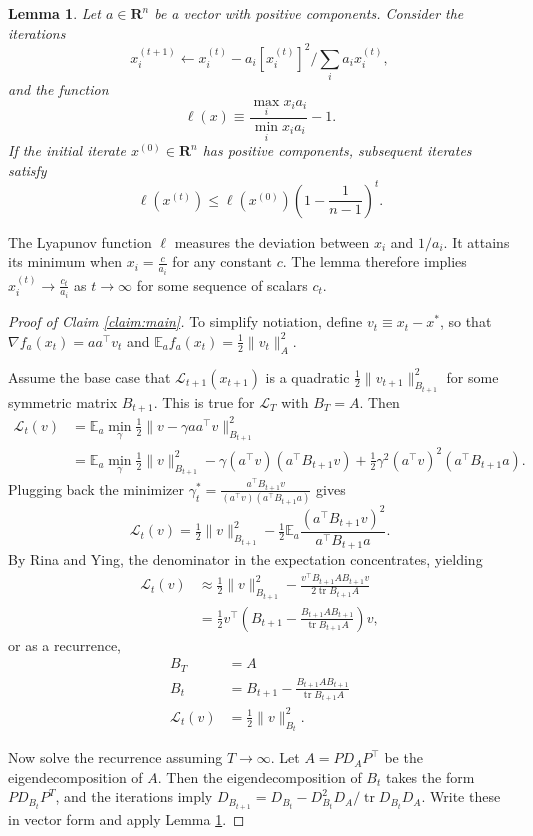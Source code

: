 \documentclass{article}
\newtheorem{lemma}{Lemma}
\newcommand{\half}{\tfrac{1}{2}}
\newcommand{\tr}{\mathop{\text{tr}}}
\newcommand{\E}{\mathbb{E}}
\renewcommand{\L}{\mathcal{L}}
\newcommand{\R}{\mathbf{R}}
\begin{document}
\begin{lemma}\label{lemma:inverse}
Let $a\in \R^n$ be a vector with positive components. Consider the iterations
\[
x_i^{(t+1)} \leftarrow x_i^{(t)} - a_i \left[x_i^{(t)}\right]^2/\sum_i a_i x_i^{(t)},
\]
and the function 
\[
\ell(x) \equiv \frac{\max_i x_i a_i}{\min_i x_i a_i}-1.
\]
If the initial iterate $x^{(0)} \in \R^n$ has positive components, subsequent iterates satisfy
\[
\ell(x^{(t)}) \leq \ell(x^{(0)}) \left(1-\frac{1}{n-1}\right)^t.
\]
\end{lemma}

The Lyapunov function $\ell$ measures the deviation between $x_i$ and $1/a_i$. It attains its minimum when $x_i = \frac{c}{a_i}$ for any constant $c$. The lemma therefore implies $x_i^{(t)} \to \frac{c_t}{a_i}$ as $t\to\infty$ for some sequence of scalars $c_t$. 
 
\begin{proof}[Proof of Claim \ref{claim:main}]
To simplify notiation, define $v_t\equiv x_t-x^*$, so that $\nabla f_a(x_t) = aa^\top v_t$ and $\E_a f_a(x_t) = \half \|v_t\|_A^2$.

Assume the base case that $\L_{t+1}(x_{t+1})$ is a quadratic $\half \|v_{t+1}\|_{B_{t+1}}^2$ for some symmetric matrix $B_{t+1}$. This is true for $\L_T$ with $B_T=A$. Then
\begin{align}
\L_t(v) &= \E_a \min_\gamma \half \|v-\gamma aa^\top v\|_{B_{t+1}}^2 \\
&= \E_a \min_\gamma \half \|v\|_{B_{t+1}}^2 - \gamma  (a^\top v)(a^\top B_{t+1} v) +  \half \gamma^2  (a^\top v)^2 (a^\top B_{t+1} a).
\end{align}
Plugging back the minimizer $\gamma_t^* = \frac{a^\top B_{t+1} v}{(a^\top v)(a^\top B_{t+1} a)}$ gives
$$\L_t(v) = \half \|v\|_{B_{t+1}}^2 - \half \E_a \frac{(a^\top B_{t+1} v)^2}{a^\top B_{t+1} a}.$$
By Rina and Ying, the denominator in the expectation concentrates, yielding
\begin{align}
\L_t(v) &\approx \half \|v\|_{B_{t+1}}^2 - \frac{v^\top B_{t+1} A B_{t+1} v }{2\tr B_{t+1} A} \\
&= \half v^\top \left(B_{t+1} -   \frac{B_{t+1} A B_{t+1}}{\tr B_{t+1} A} \right) v,
\end{align}
or as a recurrence,
\begin{align}
B_T &= A \\
B_t &= B_{t+1} - \frac{B_{t+1} A B_{t+1}}{\tr B_{t+1} A} \label{eq:recurrence}\\
\L_t(v) &= \half \|v\|_{B_t}^2.
\end{align}

Now solve the recurrence assuming $T\to\infty$. Let $A=PD_AP^\top$ be the eigendecomposition of $A$. Then the eigendecomposition of $B_t$ takes the form $PD_{B_t}P^T$, and the iterations imply $D_{B_{t+1}} = D_{B_t} - D_{B_t}^2 D_A/\tr D_{B_t} D_A$. Write these in vector form and apply Lemma \ref{lemma:inverse}.
\end{proof}
\end{document}
